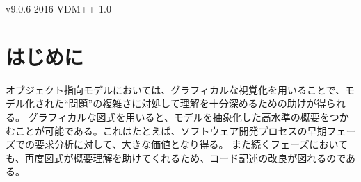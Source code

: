 \documentclass[\pformat,12pt,twoside]{jarticle}
\newcommand{\vdmtools}{\textbf{VDMTools}}
\newcommand{\vdmtoolsver}{v9.0.6}
\begin{document}
       {\vdmtoolsver}
       {2016}
       {VDM++}
       {1.0}



\nolinenumbering
{}

\newcommand{\tab}{\makebox[4em]{}}


\vfill
\begin{abstract}
オブジェクト指向分析におけるグラフィカルモデルの限界については、広く知られていることである。 視覚化においては優れている一方で、正確かつ明白な記述を行うために十分なものではない。 

本書では、オブジェクト指向形式仕様言語VDM++において、UMLにおけるグラフィカルモデルの利点を形式モデル化や正当性確認への合理的かつ簡易なアプローチに結びつける手法とツールを、\vdmtools\ の機能を借りて明らかにしていく。

\vdmtools\ は VDM++ と UML(Rational Rose) の相互変換を提供している。
これによりUMLのユーザーもまた、不変条件や事前条件および事後条件といった自動的な注釈チェックを用いて、型チェックを行ったり実行可能モデルのテストを行うといった、強化された分析と正当性確認の機能を得ることとなる。

\end{abstract}
\vfill

\newpage

\section{はじめに}

オブジェクト指向モデルにおいては、グラフィカルな視覚化を用いることで、モデル化された``問題''の複雑さに対処して理解を十分深めるための助けが得られる。
グラフィカルな図式を用いると、モデルを抽象化した高水準の概要をつかむことが可能である。これはたとえば、ソフトウェア開発プロセスの早期フェーズでの要求分析に対して、大きな価値となり得る。
また続くフェーズにおいても、再度図式が概要理解を助けてくれるため、コード記述の改良が図れるのである。
\end{document}
